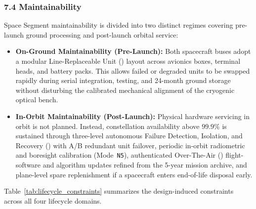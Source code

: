 \subsubsection{7.4 Maintainability}

Space Segment maintainability is divided into two distinct regimes covering pre-launch ground processing and post-launch orbital service:

\begin{itemize}[leftmargin=*, itemsep=0.35em, topsep=0.25em]
    \item \textbf{On-Ground Maintainability (Pre-Launch):} Both spacecraft buses adopt a modular Line-Replaceable Unit () layout across avionics boxes,  terminal heads, and battery packs. This allows failed or degraded units to be swapped rapidly during serial integration, testing, and 24-month ground storage without disturbing the calibrated mechanical alignment of the cryogenic optical bench.
    \item \textbf{In-Orbit Maintainability (Post-Launch):} Physical hardware servicing in orbit is not planned. Instead, constellation availability above $99.9\%$ is sustained through three-level autonomous Failure Detection, Isolation, and Recovery () with A/B redundant unit failover, periodic in-orbit radiometric and boresight calibration (Mode~\texttt{N5}), authenticated Over-The-Air () flight-software and algorithm updates refined from the 5-year mission archive, and plane-level spare replenishment if a spacecraft enters end-of-life disposal early.
\end{itemize}

Table~\ref{tab:lifecycle_constraints} summarizes the design-induced constraints across all four lifecycle domains.


